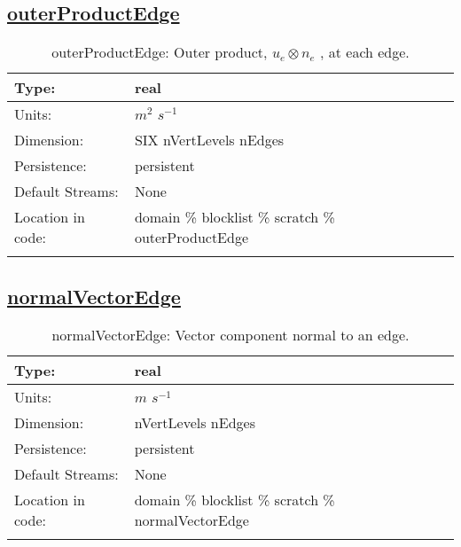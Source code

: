 \subsection[outerProductEdge]{\hyperref[sec:var_tab_scratch]{outerProductEdge}}
\label{subsec:var_sec_scratch_outerProductEdge}
\begin{center}
\begin{longtable}{| p{2.0in} | p{4.0in} |}
        \hline 
        Type: & real \\
        \hline 
        Units: & $m^2$ $s^{-1}$ \\
        \hline 
        Dimension: & SIX nVertLevels nEdges \\
        \hline 
        Persistence: & persistent \\
        \hline 
		 Default Streams: & None \\
        \hline 
		 Location in code: & domain \% blocklist \% scratch \% outerProductEdge \\
		 \hline 
    \caption{outerProductEdge:  Outer product,  $u_e \otimes n_e$ , at each edge.}
\end{longtable}
\end{center}
\subsection[normalVectorEdge]{\hyperref[sec:var_tab_scratch]{normalVectorEdge}}
\label{subsec:var_sec_scratch_normalVectorEdge}
\begin{center}
\begin{longtable}{| p{2.0in} | p{4.0in} |}
        \hline 
        Type: & real \\
        \hline 
        Units: & $m$ $s^{-1}$ \\
        \hline 
        Dimension: & nVertLevels nEdges \\
        \hline 
        Persistence: & persistent \\
        \hline 
		 Default Streams: & None \\
        \hline 
		 Location in code: & domain \% blocklist \% scratch \% normalVectorEdge \\
		 \hline 
    \caption{normalVectorEdge: Vector component normal to an edge.}
\end{longtable}
\end{center}
